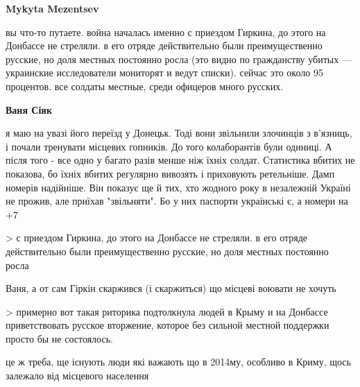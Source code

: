 \begin{itemize}
\begin{itemize}
\textbf{Mykyta Mezentsev} 

вы что-то путаете. война началась именно с приездом Гиркина, до этого на
Донбассе не стреляли. в его отряде действительно были преимущественно русские,
но доля местных постоянно росла (это видно по гражданству убитых — украинские
исследователи мониторят и ведут списки). сейчас это около 95 процентов. все
солдаты местные, среди офицеров много русских.



 
\textbf{Ваня Сіяк} 

я маю на увазі його переїзд у Донецьк. Тоді вони звільнили злочинців з
в'язниць, і почали тренувати місцевих гопників. До того колаборантів були
одиниці. А після того - все одно у багато разів менше ніж їхніх солдат.
Статистика вбитих не показова, бо їхніх вбитих регулярно вивозять і приховують
ретельніше. Дамп номерів надійніше. Він показує ще й тих, хто жодного року в
незалежній Україні не прожив, але приїхав "звільняти". Бо у них паспорти
українські є, а номери на +7

 
> с приездом Гиркина, до этого на Донбассе не стреляли. в его отряде
действительно были преимущественно русские, но доля местных постоянно росла

Ваня, а от сам Гіркін скаржився (і скаржиться) що місцеві воювати не хочуть


 
> примерно вот такая риторика подтолкнула людей в Крыму и на Донбассе
приветствовать русское вторжение, которое без сильной местной поддержки просто
бы не состоялось.

це ж треба, ще існують люди які важають що в 2014му, особливо в Криму, щось
залежало від місцевого населення


\end{itemize}
\end{itemize}
